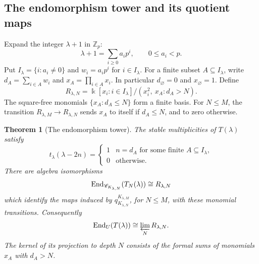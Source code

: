 \documentclass[11pt,reqno]{amsart}
\newcommand{\kk}{\Bbbk}\newcommand{\ZZ}{\mathbb Z}\newcommand{\NN}{\mathbb N}
\newtheorem{theorem}{Theorem}[section]
\theoremstyle{definition}
\theoremstyle{remark}
\numberwithin{equation}{section}
\begin{document}
\subsection{The endomorphism tower and its quotient maps}
Expand the integer $\lambda+1$ in $\ZZ_p$:
\[
 \lambda+1=\sum_{i\geq0}a_ip^i,\qquad 0\leq a_i<p.
\]
Put $I_\lambda=\{i:a_i\ne0\}$ and $w_i=a_ip^i$ for $i\in I_\lambda$.
For a finite subset $A\subseteq I_\lambda$, write
$d_A=\sum_{i\in A}w_i$ and $x_A=\prod_{i\in A}x_i$.
In particular $d_\varnothing=0$ and $x_\varnothing=1$. Define
\begin{equation}\label{eq:digit-model}
 R_{\lambda,N}
 =\kk[x_i:i\in I_\lambda]/(x_i^2,\ x_A:d_A>N).
\end{equation}
The square-free monomials $\{x_A:d_A\leq N\}$ form a finite basis.
For $N\leq M$, the transition $R_{\lambda,M}\to R_{\lambda,N}$
sends $x_A$ to itself if $d_A\leq N$, and to zero otherwise.

\begin{theorem}[The endomorphism tower]\label{thm:rank-one-tower}
The stable multiplicities of $T(\lambda)$ satisfy
\[
 t_\lambda(\lambda-2n)=
 \begin{cases}1&n=d_A\text{ for some finite }A\subseteq I_\lambda,\\
 0&\text{otherwise}.
 \end{cases}
\]
There are algebra isomorphisms
\[
 \operatorname{End}_{\mathscr C_{K_{\lambda,N}}}(T_N(\lambda))\cong R_{\lambda,N}
\]
which identify the maps induced by
$q_{K_{\lambda,N}}^{K_{\lambda,M}}$, for $N\leq M$, with these
monomial transitions. Consequently
\[
 \operatorname{End}_U(T(\lambda))\cong\varprojlim_N R_{\lambda,N}.
\]
The kernel of its projection to depth $N$ consists of the formal sums
of monomials $x_A$ with $d_A>N$.
\end{theorem}
\end{document}

